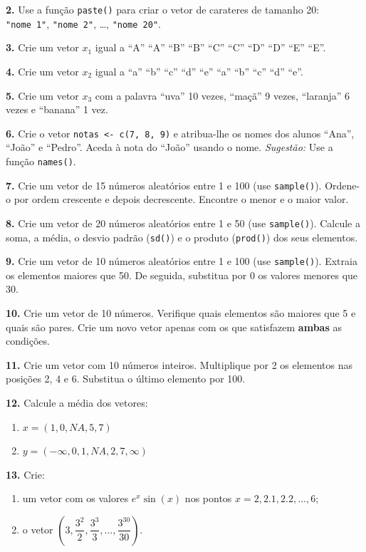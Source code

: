 \documentclass[
  portuguese,
  11pt,
  openany]{book}
\providecommand{\tightlist}{%
  \setlength{\itemsep}{0pt}\setlength{\parskip}{0pt}}
\begin{document}
\textbf{2.} Use a função \texttt{paste()} para criar o vetor de carateres de tamanho 20:
\texttt{"nome\ 1"}, \texttt{"nome\ 2"}, \ldots, \texttt{"nome\ 20"}.

\textbf{3.} Crie um vetor \(x_1\) igual a ``A'' ``A'' ``B'' ``B'' ``C'' ``C'' ``D'' ``D'' ``E'' ``E''.

\textbf{4.} Crie um vetor \(x_2\) igual a ``a'' ``b'' ``c'' ``d'' ``e'' ``a'' ``b'' ``c'' ``d'' ``e''.

\textbf{5.} Crie um vetor \(x_3\) com a palavra ``uva'' 10 vezes, ``maçã'' 9 vezes,
``laranja'' 6 vezes e ``banana'' 1 vez.

\textbf{6.} Crie o vetor \texttt{notas\ \textless{}-\ c(7,\ 8,\ 9)} e atribua-lhe os nomes dos alunos
``Ana'', ``João'' e ``Pedro''. Aceda à nota do ``João'' usando o nome.
\emph{Sugestão:} Use a função \texttt{names()}.

\textbf{7.} Crie um vetor de 15 números aleatórios entre 1 e 100 (use \texttt{sample()}).
Ordene-o por ordem crescente e depois decrescente. Encontre o menor e o maior
valor.

\textbf{8.} Crie um vetor de 20 números aleatórios entre 1 e 50 (use \texttt{sample()}).
Calcule a soma, a média, o desvio padrão (\texttt{sd()}) e o produto (\texttt{prod()}) dos seus
elementos.

\textbf{9.} Crie um vetor de 10 números aleatórios entre 1 e 100 (use \texttt{sample()}).
Extraia os elementos maiores que 50. De seguida, substitua por 0 os valores
menores que 30.

\textbf{10.} Crie um vetor de 10 números. Verifique quais elementos são maiores que 5
e quais são pares. Crie um novo vetor apenas com os que satisfazem \textbf{ambas} as
condições.

\textbf{11.} Crie um vetor com 10 números inteiros. Multiplique por 2 os elementos nas
posições 2, 4 e 6. Substitua o último elemento por 100.

\textbf{12.} Calcule a média dos vetores:

\begin{enumerate}
\def\labelenumi{(\alph{enumi})}
\tightlist
\item
  \(x = (1, 0, NA, 5, 7)\)
\item
  \(y = (-\infty, 0, 1, NA, 2, 7, \infty)\)
\end{enumerate}

\textbf{13.} Crie:

\begin{enumerate}
\def\labelenumi{(\alph{enumi})}
\tightlist
\item
  um vetor com os valores \(e^{x}\sin(x)\) nos pontos \(x = 2, 2.1, 2.2,
  \ldots, 6\);
\item
  o vetor \(\left(3, \dfrac{3^2}{2}, \dfrac{3^3}{3}, \ldots,
  \dfrac{3^{30}}{30}\right)\).
\end{enumerate}
\end{document}
